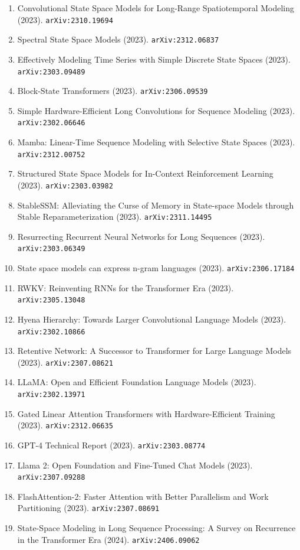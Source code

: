 \documentclass[11pt]{article}
\begin{document}
\begin{enumerate}
  \item Convolutional State Space Models for Long-Range Spatiotemporal Modeling (2023). \texttt{arXiv:2310.19694}
  \item Spectral State Space Models (2023). \texttt{arXiv:2312.06837}
  \item Effectively Modeling Time Series with Simple Discrete State Spaces (2023). \texttt{arXiv:2303.09489}
  \item Block-State Transformers (2023). \texttt{arXiv:2306.09539}
  \item Simple Hardware-Efficient Long Convolutions for Sequence Modeling (2023). \texttt{arXiv:2302.06646}
  \item Mamba: Linear-Time Sequence Modeling with Selective State Spaces (2023). \texttt{arXiv:2312.00752}
  \item Structured State Space Models for In-Context Reinforcement Learning (2023). \texttt{arXiv:2303.03982}
  \item StableSSM: Alleviating the Curse of Memory in State-space Models through
  Stable Reparameterization (2023). \texttt{arXiv:2311.14495}
  \item Resurrecting Recurrent Neural Networks for Long Sequences (2023). \texttt{arXiv:2303.06349}
  \item State space models can express n-gram languages (2023). \texttt{arXiv:2306.17184}
  \item RWKV: Reinventing RNNs for the Transformer Era (2023). \texttt{arXiv:2305.13048}
  \item Hyena Hierarchy: Towards Larger Convolutional Language Models (2023). \texttt{arXiv:2302.10866}
  \item Retentive Network: A Successor to Transformer for Large Language Models (2023). \texttt{arXiv:2307.08621}
  \item LLaMA: Open and Efficient Foundation Language Models (2023). \texttt{arXiv:2302.13971}
  \item Gated Linear Attention Transformers with Hardware-Efficient Training (2023). \texttt{arXiv:2312.06635}
  \item GPT-4 Technical Report (2023). \texttt{arXiv:2303.08774}
  \item Llama 2: Open Foundation and Fine-Tuned Chat Models (2023). \texttt{arXiv:2307.09288}
  \item FlashAttention-2: Faster Attention with Better Parallelism and Work
  Partitioning (2023). \texttt{arXiv:2307.08691}
  \item State-Space Modeling in Long Sequence Processing: A Survey on Recurrence in the Transformer Era (2024). \texttt{arXiv:2406.09062}

\end{enumerate}
\end{document}
